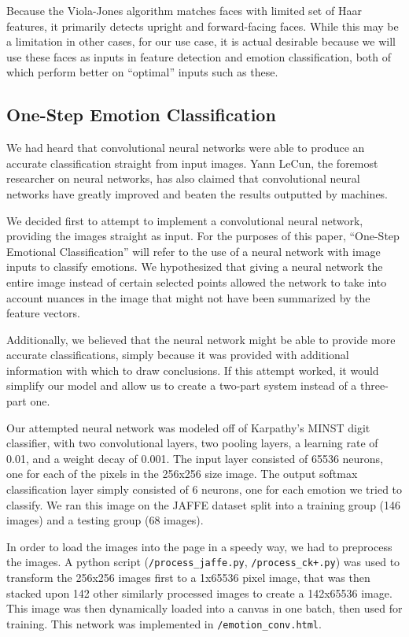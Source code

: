 \documentclass[10pt,twocolumn,letterpaper]{article}
\begin{document}
Because the Viola-Jones algorithm matches faces with limited set of Haar features, it primarily detects upright and forward-facing faces. While this may be a limitation in other cases, for our use case, it is actual desirable because we will use these faces as inputs in feature detection and emotion classification, both of which perform better on ``optimal'' inputs such as these.

\subsection{One-Step Emotion Classification}

We had heard that convolutional neural networks were able to produce an accurate classification straight from input images. Yann LeCun, the foremost researcher on neural networks, has also claimed that convolutional neural networks have greatly improved and beaten the results outputted by machines.

We decided first to attempt to implement a convolutional neural network, providing the images straight as input. For the purposes of this paper, ``One-Step Emotional Classification'' will refer to the use of a neural network with image inputs to classify emotions. We hypothesized that giving a neural network the entire image instead of certain selected points allowed the network to take into account nuances in the image that might not have been summarized by the feature vectors. 

Additionally, we believed that the neural network might be able to provide more accurate classifications, simply because it was provided with additional information with which to draw conclusions. If this attempt worked, it would simplify our model and allow us to create a two-part system instead of a three-part one.

Our attempted neural network was modeled off of Karpathy's MINST digit classifier, with two convolutional layers, two pooling layers, a learning rate of 0.01, and a weight decay of 0.001. The input layer consisted of 65536 neurons, one for each of the pixels in the 256x256 size image. The output softmax classification layer simply consisted of 6 neurons, one for each emotion we tried to classify. We ran this image on the JAFFE dataset split into a training group (146 images) and a testing group (68 images). 

In order to load the images into the page in a speedy way, we had to preprocess the images. A python script (\verb|/process_jaffe.py|, \verb|/process_ck+.py|) was used to transform the 256x256 images first to a 1x65536 pixel image, that was then stacked upon 142 other similarly processed images to create a 142x65536 image. This image was then dynamically loaded into a canvas in one batch, then used for training. This network was implemented in \verb|/emotion_conv.html|.
\end{document}
